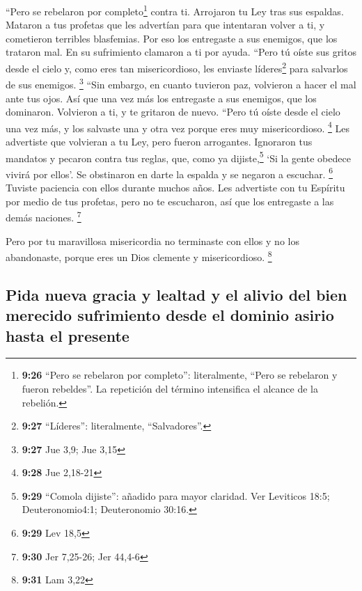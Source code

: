  ``Pero se rebelaron por completo\footnote{\textbf{9:26}
  ``Pero se rebelaron por completo'': literalmente, ``Pero se rebelaron
  y fueron rebeldes''. La repetición del término intensifica el alcance
  de la rebelión.} contra ti. Arrojaron tu Ley tras sus espaldas.
Mataron a tus profetas que les advertían para que intentaran volver a
ti, y cometieron terribles blasfemias.  Por eso los
entregaste a sus enemigos, que los trataron mal. En su sufrimiento
clamaron a ti por ayuda. ``Pero tú oíste sus gritos desde el cielo y,
como eres tan misericordioso, les enviaste líderes\footnote{\textbf{9:27}
  ``Líderes'': literalmente, ``Salvadores''.} para salvarlos de sus
enemigos. \footnote{\textbf{9:27} Jue 3,9; Jue 3,15} 
``Sin embargo, en cuanto tuvieron paz, volvieron a hacer el mal ante tus
ojos. Así que una vez más los entregaste a sus enemigos, que los
dominaron. Volvieron a ti, y te gritaron de nuevo. ``Pero tú oíste desde
el cielo una vez más, y los salvaste una y otra vez porque eres muy
misericordioso. \footnote{\textbf{9:28} Jue 2,18-21}  Les
advertiste que volvieran a tu Ley, pero fueron arrogantes. Ignoraron tus
mandatos y pecaron contra tus reglas, que, como ya dijiste,\footnote{\textbf{9:29}
  ``Comola dijiste'': añadido para mayor claridad. Ver Leviticos 18:5;
  Deuteronomio4:1; Deuteronomio 30:16.} `Si la gente obedece vivirá por
ellos'. Se obstinaron en darte la espalda y se negaron a escuchar.
\footnote{\textbf{9:29} Lev 18,5}  Tuviste paciencia con
ellos durante muchos años. Les advertiste con tu Espíritu por medio de
tus profetas, pero no te escucharon, así que los entregaste a las demás
naciones. \footnote{\textbf{9:30} Jer 7,25-26; Jer 44,4-6}

 Pero por tu maravillosa misericordia no terminaste con
ellos y no los abandonaste, porque eres un Dios clemente y
misericordioso. \footnote{\textbf{9:31} Lam 3,22}

\hypertarget{pida-nueva-gracia-y-lealtad-y-el-alivio-del-bien-merecido-sufrimiento-desde-el-dominio-asirio-hasta-el-presente}{%
\subsection{Pida nueva gracia y lealtad y el alivio del bien merecido
sufrimiento desde el dominio asirio hasta el
presente}\label{pida-nueva-gracia-y-lealtad-y-el-alivio-del-bien-merecido-sufrimiento-desde-el-dominio-asirio-hasta-el-presente}}

